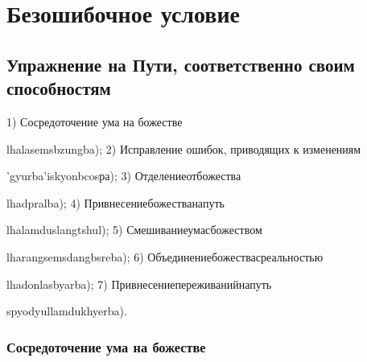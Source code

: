 \section{Безошибочное условие}

\subsection{ Упражнение на Пути, соответственно своим способностям}

1)  Сосредоточение ума на божестве {lhalasemsbzungba);
2)  Исправление ошибок, приводящих к изменениям {'gyurba'iskyonbcosра);
3)  Отделениеотбожества{lhadpralba);
4)  Привнесениебожестванапуть{lhalamduslangtshul);
5)  Смешиваниеумасбожеством{lharangsemsdangbsreba);
6)  Объединениебожествасреальностью{lhadonlasbyarba);
7)  Привнесениепереживанийнапуть{spyodyullamdukhyerba).

\subsubsection{Сосредоточение ума на божестве}

}}}}}}}
